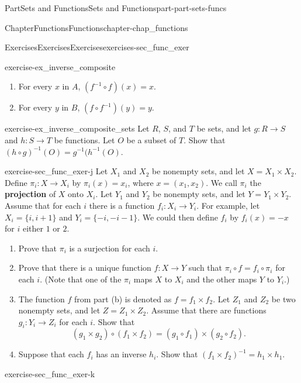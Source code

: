 \documentclass[oneside,10pt,]{book}
\newcommand{\terminology}[1]{\textbf{#1}}
\numberwithin{equation}{chapter}
\begin{document}
\begin{partptx}{Part}{Sets and Functions}{}{Sets and Functions}{}{}{part-part-sets-funcs}
\begin{chapterptx}{Chapter}{Functions}{}{Functions}{}{}{chapter-chap_functions}
\begin{exercises-section}{Exercises}{Exercises}{}{Exercises}{}{}{exercises-sec_func_exer}
\begin{divisionexercise}{8}{}{}{exercise-ex_inverse_composite}
\begin{enumerate}[font=\bfseries,label=(\alph*),ref=\alph*]
\item{}For every \(x\) in \(A\), \(\left( f^{-1} \circ f \right)(x) = x\).%
\item{}For every \(y\) in \(B\), \(\left( f \circ f^{-1}\right)(y) = y\).%
\end{enumerate}%
\end{divisionexercise}%
\begin{divisionexercise}{9}{}{}{exercise-ex_inverse_composite_sets}%
Let \(R\), \(S\), and \(T\) be sets, and let \(g: R \to S\) and \(h : S \to T\) be functions. Let \(O\) be a subset of \(T\). Show that \((h \circ g)^{-1}(O) = g^{-1}(h^{-1}(O)\).%
\end{divisionexercise}%
\begin{divisionexercise}{10}{}{}{exercise-sec_func_exer-j}%
Let \(X_1\) and \(X_2\) be nonempty sets, and let \(X = X_1 \times X_2\). Define \(\pi_i :X  \to X_i\) by \(\pi_i(x) = x_i\), where \(x = (x_1,x_2)\). We call \(\pi_i\) the \terminology{projection} of \(X\) onto \(X_i\). Let \(Y_1\) and \(Y_2\) be nonempty sets, and let \(Y = Y_1 \times Y_2\). Assume that for each \(i\) there is a function \(f_i : X_i \to Y_i\). For example, let \(X_i = \{i,i+1\}\) and \(Y_i = \{-i, -i-1\}\). We could then define \(f_i\) by \(f_i(x) = -x\) for \(i\) either \(1\) or \(2\).%
\begin{enumerate}[font=\bfseries,label=(\alph*),ref=\alph*]%
\item{}Prove that \(\pi_i\) is a surjection for each \(i\).%
\item{}Prove that there is a unique function \(f: X \to Y\) such that \(\pi_i \circ f = f_i \circ \pi_i\) for each \(i\). (Note that one of the \(\pi_i\) maps \(X\) to \(X_i\) and the other maps \(Y\) to \(Y_i\).)%
\item{}The function \(f\) from part (b) is denoted as \(f = f_1 \times f_2\). Let \(Z_1\) and \(Z_2\) be two nonempty sets, and let \(Z = Z_1 \times Z_2\). Assume that there are functions \(g_i : Y_i \to Z_i\) for each \(i\). Show that%
\begin{equation*}
\left(g_1 \times g_2\right) \circ \left(f_1 \times f_2\right) = (g_1 \circ f_1) \times (g_2 \circ f_2)\text{.}
\end{equation*}
%
\item{}Suppose that each \(f_i\) has an inverse \(h_i\). Show that \(\left(f_1 \times f_2\right)^{-1} = h_1 \times h_1\).%
\end{enumerate}%
\end{divisionexercise}%
\begin{divisionexercise}{11}{}{}{exercise-sec_func_exer-k}%

\end{divisionexercise}
\end{exercises-section}
\end{chapterptx}
\end{partptx}
\end{document}
